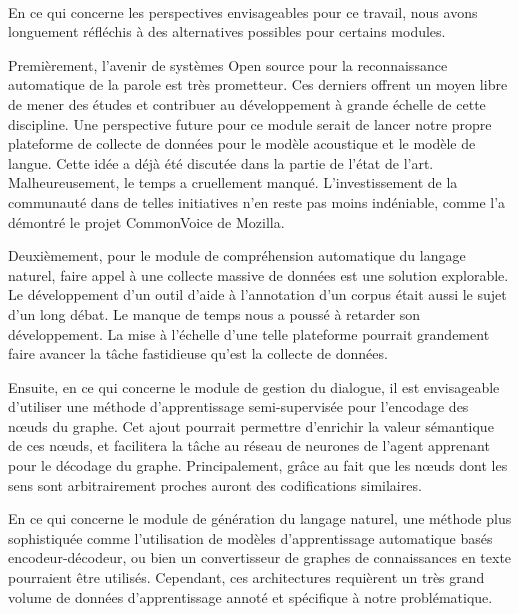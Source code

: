 \paragraph{}
En ce qui concerne les perspectives envisageables pour ce travail, nous avons longuement réfléchis à des alternatives possibles pour certains modules.
\par
Premièrement, l'avenir de systèmes Open source pour la reconnaissance automatique de la parole est très prometteur. Ces derniers offrent un moyen libre de mener des études et contribuer au développement à grande échelle de cette discipline. Une perspective future pour ce module serait de lancer notre propre plateforme de collecte de données pour le modèle acoustique et le modèle de langue. Cette idée a déjà été discutée dans la partie de l'état de l'art. Malheureusement, le temps a cruellement manqué. L'investissement de la communauté dans de telles initiatives n'en reste pas moins indéniable, comme l'a démontré le projet CommonVoice de Mozilla.
\par
Deuxièmement, pour le module de compréhension automatique du langage naturel, faire appel à une collecte massive de données est une solution explorable. Le développement d'un outil d'aide à l'annotation d'un corpus était aussi le sujet d'un long débat. Le manque de temps nous a poussé à retarder son développement. La mise à l'échelle d'une telle plateforme pourrait grandement faire avancer la tâche fastidieuse qu'est la collecte de données. 
\par 

Ensuite, en ce qui concerne le module de gestion du dialogue, il est envisageable d'utiliser une méthode d'apprentissage semi-supervisée pour l'encodage des n\oe{}uds du graphe. Cet ajout pourrait permettre d'enrichir la valeur sémantique de ces n\oe{}uds, et facilitera la tâche au réseau de neurones de l'agent apprenant pour le décodage du graphe. Principalement, grâce au fait que les n\oe{}uds dont les sens sont arbitrairement proches auront des codifications similaires.

\par
En ce qui concerne le module de génération du langage naturel, une méthode plus sophistiquée comme l'utilisation de modèles d'apprentissage automatique basés encodeur-décodeur, ou bien un convertisseur de graphes de connaissances en texte pourraient être utilisés. Cependant, ces architectures requièrent un très grand volume de données d'apprentissage annoté et spécifique à notre problématique.

